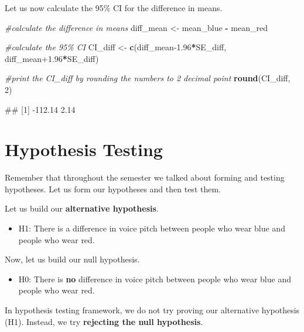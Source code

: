 \documentclass[
]{book}
\newenvironment{Shaded}{\begin{snugshade}}{\end{snugshade}}
\newcommand{\CommentTok}[1]{\textcolor[rgb]{0.56,0.35,0.01}{\textit{#1}}}
\newcommand{\DecValTok}[1]{\textcolor[rgb]{0.00,0.00,0.81}{#1}}
\newcommand{\FloatTok}[1]{\textcolor[rgb]{0.00,0.00,0.81}{#1}}
\newcommand{\FunctionTok}[1]{\textcolor[rgb]{0.13,0.29,0.53}{\textbf{#1}}}
\newcommand{\NormalTok}[1]{#1}
\newcommand{\OtherTok}[1]{\textcolor[rgb]{0.56,0.35,0.01}{#1}}
\newcommand{\SpecialCharTok}[1]{\textcolor[rgb]{0.81,0.36,0.00}{\textbf{#1}}}
\providecommand{\tightlist}{%
  \setlength{\itemsep}{0pt}\setlength{\parskip}{0pt}}
\begin{document}
Let us now calculate the 95\% CI for the difference in means.

\begin{Shaded}
\begin{Highlighting}[]
\CommentTok{\#calculate the difference in means}
\NormalTok{diff\_mean }\OtherTok{\textless{}{-}}\NormalTok{ mean\_blue }\SpecialCharTok{{-}}\NormalTok{ mean\_red}

\CommentTok{\#calculate the 95\% CI}
\NormalTok{CI\_diff }\OtherTok{\textless{}{-}} \FunctionTok{c}\NormalTok{(diff\_mean}\FloatTok{{-}1.96}\SpecialCharTok{*}\NormalTok{SE\_diff, diff\_mean}\FloatTok{+1.96}\SpecialCharTok{*}\NormalTok{SE\_diff)}

\CommentTok{\#print the CI\_diff by rounding the numbers to 2 decimal point}
\FunctionTok{round}\NormalTok{(CI\_diff, }\DecValTok{2}\NormalTok{)}
\end{Highlighting}
\end{Shaded}

\begin{Shaded}
\begin{Highlighting}[]
\NormalTok{\#\# [1] {-}112.14    2.14}
\end{Highlighting}
\end{Shaded}

\hypertarget{hypothesis-testing}{%
\section{Hypothesis Testing}\label{hypothesis-testing}}

Remember that throughout the semester we talked about forming and testing hypotheses. Let us form our hypotheses and then test them.

Let us build our \textbf{alternative hypothesis}.

\begin{itemize}
\tightlist
\item
  H1: There is a difference in voice pitch between people who wear blue and people who wear red.
\end{itemize}

Now, let us build our null hypothesis.

\begin{itemize}
\tightlist
\item
  H0: There is \textbf{no} difference in voice pitch between people who wear blue and people who wear red.
\end{itemize}

In hypothesis testing framework, we do not try proving our alternative hypothesis (H1). Instead, we try \textbf{rejecting the null hypothesis}.
\end{document}
